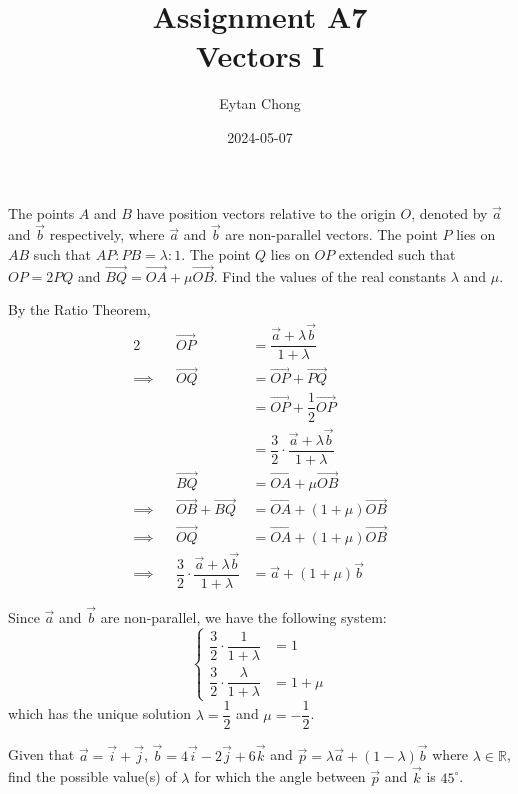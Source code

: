 \documentclass{jhwhw}
\title{Assignment A7\\Vectors I}
\author{Eytan Chong}
\date{2024-05-07}
\begin{document}
    \problem{}
        The points $A$ and $B$ have position vectors relative to the origin $O$, denoted by $\vec a$ and $\vec b$ respectively, where $\vec a$ and $\vec b$ are non-parallel vectors. The point $P$ lies on $AB$ such that $AP : PB = \lambda : 1$. The point $Q$ lies on $OP$ extended such that $OP = 2PQ$ and $\overrightarrow{BQ} = \overrightarrow{OA} + \mu \overrightarrow{OB}$. Find the values of the real constants $\lambda$ and $\mu$.

    \solution
        By the Ratio Theorem,
        \begin{alignat*}{2}
            &&\overrightarrow{OP} &= \dfrac{\vec a + \lambda \vec b}{1 + \lambda}\\
            \implies&&\overrightarrow{OQ} &= \overrightarrow{OP} + \overrightarrow{PQ}\\
            && &= \overrightarrow{OP} + \dfrac12\overrightarrow{OP}\\
            && &= \dfrac32 \cdot \dfrac{\vec a + \lambda \vec b}{1 + \lambda}\\
            &&\overrightarrow{BQ} &= \overrightarrow{OA} + \mu \overrightarrow{OB}\\
            \implies&&\overrightarrow{OB} + \overrightarrow{BQ} &= \overrightarrow{OA} + (1 + \mu)\overrightarrow{OB}\\
            \implies&&\overrightarrow{OQ} &= \overrightarrow{OA} + (1 + \mu)\overrightarrow{OB}\\
            \implies&&\dfrac32 \cdot \dfrac{\vec a + \lambda \vec b}{1 + \lambda} &= \vec a + (1 + \mu)\vec b
        \end{alignat*}

        Since $\vec a$ and $\vec b$ are non-parallel, we have the following system:
        \begin{equation*}
            \begin{cases}
                \dfrac32 \cdot \dfrac1{1 + \lambda} &= 1\\
                \dfrac32 \cdot \dfrac\lambda{1 + \lambda} &= 1 + \mu
            \end{cases}
        \end{equation*}
        \noindent which has the unique solution $\lambda = \dfrac12$ and $\mu = -\dfrac12$.


    \problem{}
        Given that $\vec a = \vec i + \vec j$, $\vec b = 4 \vec i - 2 \vec j + 6 \vec k$ and $\vec p = \lambda \vec a + (1 - \lambda) \vec b$ where $\lambda \in \mathbb{R}$, find the possible value(s) of $\lambda$ for which the angle between $\vec p$ and $\vec k$ is $45^{\circ}$.
\end{document}
